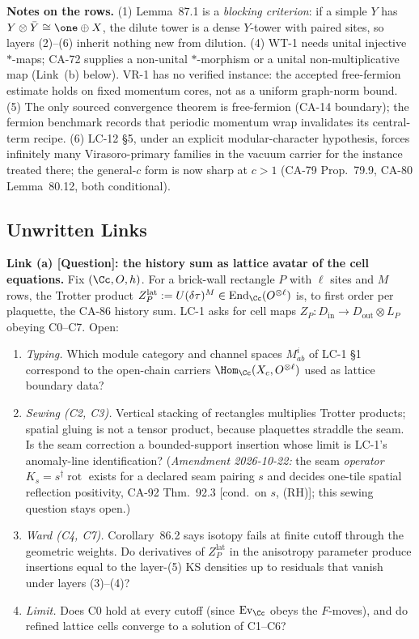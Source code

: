 \textbf{Notes on the rows.}  (1) Lemma~87.1 is a \emph{blocking criterion}: if a simple \(Y\) has
\(Y\otimes\bar Y\cong\one\oplus X\), the dilute tower is a dense \(Y\)-tower with paired sites, so
layers (2)--(6) inherit nothing new from dilution.  (4) WT-1 needs unital injective \(*\)-maps; CA-72
supplies a non-unital \(*\)-morphism or a unital non-multiplicative map (Link~(b) below).  VR-1 has no
verified instance: the accepted free-fermion estimate holds on fixed momentum cores, not as a uniform
graph-norm bound. (5) The only sourced convergence theorem is free-fermion (CA-14 boundary); the fermion
benchmark records that periodic momentum wrap invalidates its central-term recipe.  (6) LC-12 \S5, under
an explicit modular-character hypothesis, forces infinitely many Virasoro-primary families in the vacuum
carrier for the instance treated there; the general-\(c\) form is now sharp at \(c>1\) (CA-79
Prop.~79.9, CA-80 Lemma~80.12, both conditional).

\subsection{Unwritten Links}

\textbf{Link (a) [Question]: the history sum as lattice avatar of the
cell equations.}  Fix \((\Cc,O,h)\).  For a brick-wall rectangle \(P\)
with \(\ell\) sites and \(M\) rows, the Trotter product
\(Z^{\mathrm{lat}}_P:=U(\delta\tau)^M\in\operatorname{End}_\Cc(O^{\otimes\ell})\)
is, to first order per plaquette, the CA-86 history sum.  LC-1 asks for
cell maps \(Z_P:D_{\mathrm{in}}\to D_{\mathrm{out}}\otimes L_P\) obeying
C0--C7.  Open:
\begin{enumerate}
\item[(a1)] \emph{Typing.}  Which module category and channel spaces
\(M^i_{ab}\) of LC-1 \S1 correspond to the open-chain carriers
\(\Hom_\Cc(X_c,O^{\otimes\ell})\) used as lattice boundary data?
\item[(a2)] \emph{Sewing (C2, C3).}  Vertical stacking of rectangles multiplies Trotter products; spatial
gluing is not a tensor product, because plaquettes straddle the seam.  Is the seam correction a bounded-support
insertion whose limit is LC-1's anomaly-line identification?  (\emph{Amendment 2026-10-22:} the seam \emph{operator}
\(K_s=s^\dagger\operatorname{rot}\) exists for a declared seam pairing \(s\) and decides one-tile spatial reflection
positivity, CA-92 Thm.~92.3 [cond.\ on \(s\), (RH)]; this sewing question stays open.)
\item[(a3)] \emph{Ward (C4, C7).}  Corollary~86.2 says isotopy fails at
finite cutoff through the geometric weights.  Do derivatives of
\(Z^{\mathrm{lat}}_P\) in the anisotropy parameter produce insertions equal
to the layer-(5) KS densities up to residuals that vanish under layers
(3)--(4)?
\item[(a4)] \emph{Limit.}  Does C0 hold at every cutoff (since
\(\operatorname{Ev}_\Cc\) obeys the \(F\)-moves), and do refined lattice
cells converge to a solution of C1--C6?
\end{enumerate}

